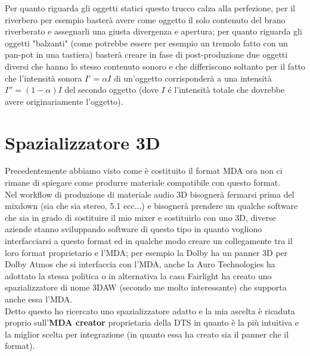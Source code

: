 \documentclass[12pt,a4paper]{report}
\begin{document}
Per quanto riguarda gli oggetti statici questo trucco calza alla perfezione, per il riverbero per esempio basterà avere come oggetto il solo contenuto del brano riverberato e assegnarli una giusta divergenza e apertura; per quanto riguarda gli oggetti "balzanti" (come potrebbe essere per esempio un tremolo fatto con un pan-pot in una tastiera) basterà creare in fase di post-produzione due oggetti diversi che hanno lo stesso contenuto sonoro e che differiscono soltanto per il fatto che l'intensità sonora $I'=\alpha I$ di un'oggetto corrisponderà a una intensità $I''=(1-\alpha) I$ del secondo oggetto (dove $I$ é l'intensità totale che dovrebbe avere originariamente l'oggetto).

\section{Spazializzatore 3D}

Precedentemente abbiamo visto come è costituito il format MDA ora non ci rimane di spiegare come produrre materiale compatibile con questo format.\\

Nel workflow di produzione di materiale audio 3D bisognerà fermarsi prima del mixdown (sia che sia stereo, 5.1 ecc...) e bisognerà prendere un qualche software che sia in grado di sostituire il mio mixer e sostituirlo con uno 3D, diverse aziende stanno sviluppando software di questo tipo in quanto vogliono interfacciarsi a questo format ed in qualche modo creare un collegamente tra il loro format proprietario e l'MDA; per esempio la Dolby ha un panner 3D per Dolby Atmos che si interfaccia con l'MDA, anche la Auro Technologies ha adottato la stessa politica o in alternativa la casa Fairlight ha creato uno spazializzatore di nome 3DAW (secondo me molto interessante) che supporta anche essa l'MDA.\\

Detto questo ho ricercato uno spazializzatore adatto e la mia ascelta è ricaduta proprio sull'\textbf{MDA creator} proprietaria della DTS in quanto è la più intuitiva e la miglior scelta per integrazione (in quanto essa ha creato sia il panner che il format).
\end{document}
